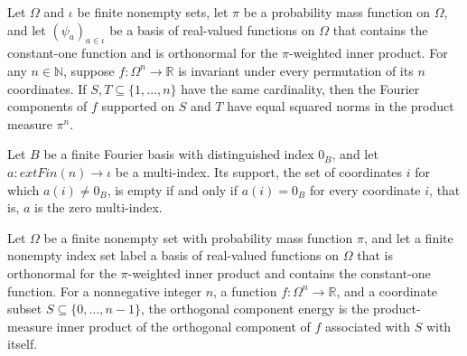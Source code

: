 \begin{theorem}
\label{FABL.FiniteFourierBasis.orthogonalComponent_energy_eq_of_symmetric_of_card_eq}
\leanok
{}
Let $\Omega$ and $\iota$ be finite nonempty sets, let $\pi$ be a probability mass
function on $\Omega$, and let $(\psi_a)_{a\in\iota}$ be a basis of real-valued functions
on $\Omega$ that contains the constant-one function and is orthonormal for the
$\pi$-weighted inner product. For any $n\in\mathbb N$, suppose $f:\Omega^n\to\mathbb R$
is invariant under every permutation of its $n$ coordinates. If
$S,T\subseteq\{1,\ldots,n\}$ have the same cardinality, then the Fourier components of
$f$ supported on $S$ and $T$ have equal squared norms in the product measure $\pi^n$.
\end{theorem}

\begin{theorem}
\label{FABL.FiniteFourierBasis.multiIndexSupport_eq_empty_iff}
\leanok
{}
Let $B$ be a finite Fourier basis with distinguished index $0_B$, and let
$a:	ext{Fin}(n)\to\iota$ be a multi-index. Its support, the set of coordinates $i$ for
which $a(i)\ne 0_B$, is empty if and only if $a(i)=0_B$ for every coordinate $i$, that
is, $a$ is the zero multi-index.
\end{theorem}

\begin{definition}
\label{FABL.FiniteFourierBasis.orthogonalComponentEnergy}
\leanok
{}
Let $\Omega$ be a finite nonempty set with probability mass function $\pi$, and let a
finite nonempty index set label a basis of real-valued functions on $\Omega$ that is
orthonormal for the $\pi$-weighted inner product and contains the constant-one function.
For a nonnegative integer $n$, a function $f\colon\Omega^n\to\mathbb R$, and a
coordinate subset $S\subseteq\{0,\ldots,n-1\}$, the orthogonal component energy is the
product-measure inner product of the orthogonal component of $f$ associated with $S$
with itself.
\end{definition}

